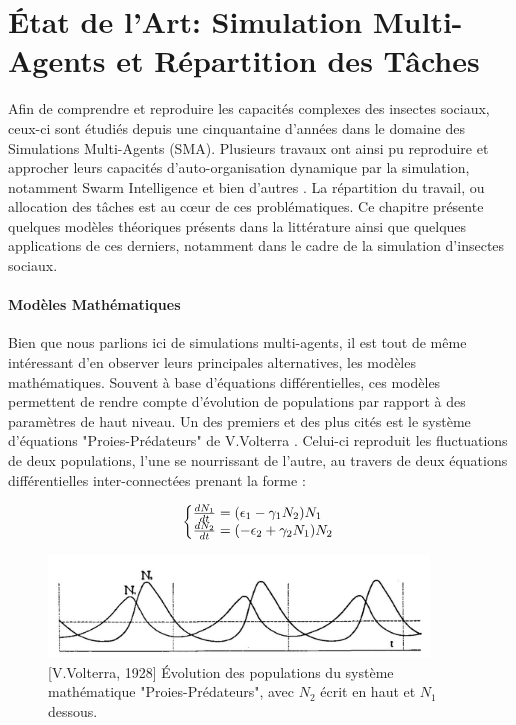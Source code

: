 \chapter{État de l'Art: Simulation Multi-Agents et Répartition des Tâches}

	Afin de comprendre et reproduire les capacités complexes des insectes sociaux, ceux-ci sont étudiés depuis une cinquantaine d'années dans le domaine des Simulations Multi-Agents (SMA). Plusieurs travaux ont ainsi pu reproduire et approcher leurs capacités d'auto-organisation dynamique par la simulation, notamment Swarm Intelligence \cite{bonabeau_natural_1999} et bien d'autres \cite{drogoul_simulation_1993, schmickl_taskselsim_2008, dornhaus_task_1998}. La répartition du travail, ou allocation des tâches est au cœur de ces problématiques. Ce chapitre présente quelques modèles théoriques présents dans la littérature ainsi que quelques applications de ces derniers, notamment dans le cadre de la simulation d'insectes sociaux.
	
    \subsubsection*{Modèles Mathématiques}
		Bien que nous parlions ici de simulations multi-agents, il est tout de même intéressant d'en observer leurs principales alternatives, les modèles mathématiques. Souvent à base d'équations différentielles, ces modèles permettent de rendre compte d'évolution de populations par rapport à des paramètres de haut niveau. Un des premiers et des plus cités est le système d'équations "Proies-Prédateurs" de V.Volterra \cite{volterra_variations_1928}. Celui-ci reproduit les fluctuations de deux populations, l'une se nourrissant de l'autre, au travers de deux équations différentielles inter-connectées prenant la forme :
		
		\begin{equation}
  			\left\{\begin{array}{@{}l@{}}
    			\frac{dN_1}{dt}=(\epsilon_1-\gamma_1 N_2) N_1\\
      			\frac{dN_2}{dt}=(- \epsilon_2 + \gamma_2 N_1) N_2
  			\end{array}\right.\,
		\end{equation}
		
		\begin{figure}
		\centering
		\includegraphics[width=0.9\textwidth]{./Pictures/Graphs/Volterra.JPG}
		\caption{[V.Volterra, 1928] \cite{volterra_variations_1928} Évolution des populations du système mathématique "Proies-Prédateurs", avec $N_2$ écrit en haut et $N_1$ dessous.}
		\label{volterra}
		\end{figure}
		
